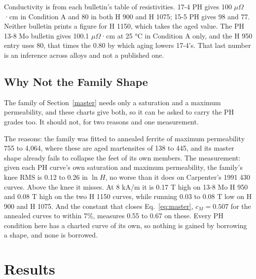 \documentclass[
  11pt,
]{article}
\newcounter{none} %
\begin{document}
Conductivity is from each bulletin's table of resistivities. 17-4 PH gives 100 $\mu\Omega$·cm in Condition A and 80 in both H 900 and H 1075; 15-5 PH gives 98 and 77. Neither bulletin prints a figure for H 1150, which takes the aged value. The PH 13-8 Mo bulletin gives 100.1 $\mu\Omega$·cm at 25 °C in Condition A only, and the H 950 entry uses 80, that times the 0.80 by which aging lowers 17-4's. That last number is an inference across alloys and not a published one.

\subsection{Why Not the Family Shape}\label{ph-family}

The family of Section~\ref{master} needs only a saturation and a maximum permeability, and these charts give both, so it can be asked to carry the PH grades too. It should not, for two reasons and one measurement.

The reasons: the family was fitted to annealed ferrite of maximum permeability 755 to 4,064, where these are aged martensites of 138 to 445, and its master shape already fails to collapse the feet of its own members. The measurement: given each PH curve's own saturation and maximum permeability, the family's knee RMS is 0.12 to 0.26 in \(\ln H\), no worse than it does on Carpenter's 1991 430 curves. Above the knee it misses. At 8 kA/m it is 0.17 T high on 13-8 Mo H 950 and 0.08 T high on the two H 1150 curves, while running 0.03 to 0.08 T low on H 900 and H 1075. And the constant that closes Eq.~\eqref{eq:master}, \(c_M = 0.507\) for the annealed curves to within 7\%, measures 0.55 to 0.67 on these. Every PH condition here has a charted curve of its own, so nothing is gained by borrowing a shape, and none is borrowed.

\section{Results}\label{results}
\end{document}
